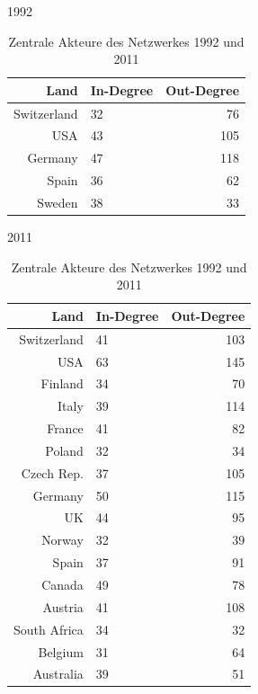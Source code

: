 \documentclass[a4paper,ngerman,oneside,titlepage,bibliography=totoc,11pt]{scrreprt}
\begin{document}
\begin{table}[ht]
\centering
\footnotesize
\begin{minipage}[t]{0.48\textwidth}

\begin{center}
1992
\end{center}

\begin{tabular}{rlr}
  \hline
 Land 											& In-Degree & Out-Degree\\ 
  \hline
 Switzerland 								& 32				& 76\\ 
 USA 	& 43				& 105\\ 
 Germany & 47				& 118\\ 
 Spain 											& 36				& 62\\ 
 Sweden 										& 38 				& 33\\ 
   \hline

\end{tabular}
\end{minipage}
\hfill	
\begin{minipage}[t]{0.48\textwidth}

\begin{center}
2011
\end{center}

\begin{tabular}{rlr}
  \hline
 Land 						& In-Degree & Out-Degree\\ 
  \hline
 Switzerland 			& 41				& 103\\ 
 USA					 		& 63				& 145\\ 
 Finland 					& 34				& 70\\ 
 Italy 						& 39 				& 114\\ 
 France						& 41				& 82\\ 
 Poland						& 32				& 34\\
 Czech Rep.		& 37				& 105\\
 Germany					& 50				& 115\\
 UK		& 44				& 95\\
 Norway						& 32				& 39\\
 Spain  					& 37				& 91\\
 Canada						& 49				& 78\\
 Austria					& 41				& 108\\
 South Africa			& 34				& 32\\
 Belgium					& 31				& 64\\
 Australia				& 39				& 51\\
   \hline

\end{tabular}
\end{minipage}
\caption{Zentrale Akteure des Netzwerkes  1992 und 2011} 
\label{tab:ZentrAkt}
	\end{table}
\end{document}
